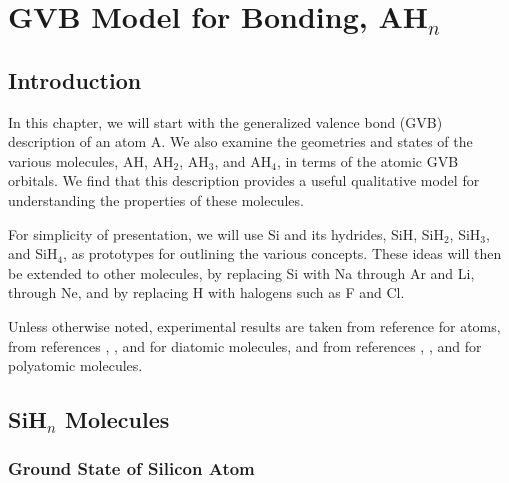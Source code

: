 \chapter{GVB Model for Bonding, AH$_n$}

\section{Introduction}

In this chapter, we will start with the generalized valence bond (GVB)
description of an atom A.  We also examine the geometries and states 
of the various molecules, AH, AH$_2$, AH$_3$, and AH$_4$, in terms of 
the atomic GVB orbitals.  We find that this 
description provides a useful qualitative model for understanding the 
properties of these molecules.

For simplicity of presentation, we will use Si and its hydrides, SiH, 
SiH$_2$, SiH$_3$, and SiH$_4$, as prototypes for outlining the various 
concepts.  These ideas will then be extended to other molecules, by 
replacing Si with Na through Ar and Li, through Ne, and by replacing 
H with halogens such as F and Cl.

Unless otherwise noted, experimental results are taken from reference 
\cite{chap6-ref1} for atoms, from references \cite{chap6-ref2}, \cite{chap6-ref3}, and \cite{chap6-ref4} for diatomic molecules, and 
from references \cite{chap6-ref5}, \cite{chap6-ref6}, and
\cite{chap6-ref7} for polyatomic molecules.

\section{SiH$_n$ Molecules}

\subsection{Ground State of Silicon Atom}

